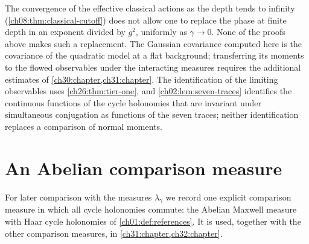 \begin{remark}\label{ch27:rem:scope}
The convergence of the effective classical actions as the depth tends to infinity (\cref{ch08:thm:classical-cutoff}) does not allow one to replace the phase at finite depth in an exponent divided by $g^2$, uniformly as $\gamma\to0$. None of the proofs above makes such a replacement. The Gaussian covariance computed here is the covariance of the quadratic model at a flat background; transferring its moments to the flowed observables under the interacting measures requires the additional estimates of \cref{ch30:chapter,ch31:chapter}. The identification of the limiting observables uses \cref{ch26:thm:tier-one}, and \cref{ch02:lem:seven-traces} identifies the continuous functions of the cycle holonomies that are invariant under simultaneous conjugation as functions of the seven traces; neither identification replaces a comparison of normal moments.
\end{remark}

\section{An Abelian comparison measure}\label{ch27:sec:abelian}

For later comparison with the measures $\lambda_\gamma$ we record one explicit comparison measure in which all cycle holonomies commute: the Abelian Maxwell measure with Haar cycle holonomies of \cref{ch01:def:references}. It is used, together with the other comparison measures, in \cref{ch31:chapter,ch32:chapter}.

